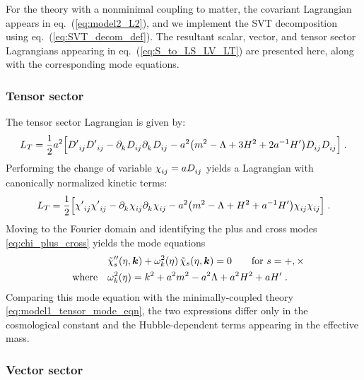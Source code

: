 \documentclass[11pt,a4paper]{article}
\newcommand{\ba}[1]{\begin{align} #1 \end{align}}
\newcommand{\bes}[1]{\begin{equation}\begin{split} #1 \end{split}\end{equation}}
\newcommand{\kvec}{{\bm k}}
\newcommand{\LT}{L_T}
\newcommand{\eref}[1]{eq.~(\ref{#1})}
\begin{document}
For the theory with a nonminimal coupling to matter, the covariant Lagrangian appears in \eref{eq:model2_L2}, and we implement the SVT decomposition using \eref{eq:SVT_decom_def}.  The resultant scalar, vector, and tensor sector Lagrangians appearing in \eref{eq:S_to_LS_LV_LT} are presented here, along with the corresponding mode equations.  

\subsubsection{Tensor sector}
\label{sub:model2_tensor_sector}

The tensor sector Lagrangian is given by: 
\ba{\label{eq:model2_LT}
    \LT = \frac{1}{2} a^2\Big[{D'}\indices{_i_j} {D'}\indices{_i_j}
    - \partial\indices{_k} D\indices{_i_j} \partial\indices{_k} D\indices{_i_j}
    - a^2 \bigl( m^2 - \Lambda + 3 H^2 + 2 a^{-1} H' \bigr) D\indices{_i_j}D\indices{_i_j} \Big] 
    \;.
}
Performing the change of variable $\chi\indices{_i_j} = a D\indices{_i_j}$ yields a Lagrangian with canonically normalized kinetic terms: 
\ba{\label{eq:model2_LT_can}
    \LT = \frac{1}{2} \Big[{\chi'}\indices{_i_j} {\chi'}\indices{_i_j}
    - \partial\indices{_k} \chi\indices{_i_j} \partial\indices{_k} \chi\indices{_i_j}
    - a^2 \bigl( m^2 - \Lambda + H^2 + a^{-1} H' \bigr) \chi\indices{_i_j}\chi\indices{_i_j}
    \Big]
    \;.
}
Moving to the Fourier domain and identifying the plus and cross modes \eqref{eq:chi_plus_cross} yields the mode equations
\bes{\label{eq:model2_tensor_mode_eqn}
    & \tilde{\chi}_s^{\prime\prime}(\eta, \kvec) + \omega_k^2(\eta) \, \tilde{\chi}_s(\eta, \kvec) = 0 \qquad \text{for $s=+,\times$} \\
    \qq{where} & \omega_k^2(\eta) = k^2 + a^2 m^2 - a^2 \Lambda + a^2 H^2 + a H^\prime 
    \;.
}
Comparing this mode equation with the minimally-coupled theory \eqref{eq:model1_tensor_mode_eqn}, the two expressions differ only in the cosmological constant and the Hubble-dependent terms appearing in the effective mass.  

\subsubsection{Vector sector}
\label{sub:model2_vector_sector}
\end{document}
